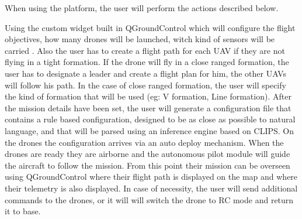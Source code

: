 When using the platform,  the user will perform the actions described below.

Using the custom widget built in QGroundControl which will configure the flight objectives, 
how many drones will be launched, witch kind of sensors will be carried .
Also the user has to create a flight path for 
each UAV if they are not flying in a tight formation. If the drone will fly in 
a close ranged formation, the user has to designate a leader and create a flight
plan for him, the other UAVs will follow his path. In the case of close ranged 
formation, the user will specify the kind of formation that will be used (eg: 
  V formation, Line formation). After the mission details have been set, the user
will generate a configuration file that contains a rule based configuration, designed
 to be as close as possible to natural language, and that will be parsed using
 an inference engine based on CLIPS.
On the drones the configuration arrives via an auto deploy mechanism. When the drones are ready
they are airborne and the autonomous pilot module will guide the aircraft to follow the mission.
From this point their mission can be overseen using QGroundControl where their
flight path is displayed on the map and where their telemetry is also displayed.
In case of necessity, the user will send additional commands to the drones, or
it will will switch the drone to RC mode and return it to base.

